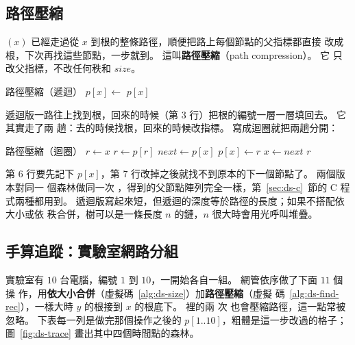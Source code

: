 \subsection{路徑壓縮}
\label{sec:ds-compress}

$(x)$ 已經走過從 $x$ 到根的整條路徑，順便把路上每個節點的父指標都直接
改成根，下次再找這些節點，一步就到。 這叫\textbf{路徑壓縮}（path compression）。 它
只改父指標，不改任何秩和 $\mathit{size}$。

\begin{pseudo}[label=alg:ds-find-rec]{路徑壓縮（遞迴）}
        \State $p[x] \gets$ 
    \EndIf
    \State \Return $p[x]$
\EndFunction
\end{pseudo}

遞迴版一路往上找到根，回來的時候（第 3 行）把根的編號一層一層填回去。 它其實走了兩
趟：去的時候找根，回來的時候改指標。 寫成迴圈就把兩趟分開：

\begin{pseudo}[label=alg:ds-find-iter]{路徑壓縮（迴圈）}
    \State $r \gets x$
     
        \State $r \gets p[r]$
    \EndWhile
     
        \State $\mathit{next} \gets p[x]$
        \State $p[x] \gets r$
        \State $x \gets \mathit{next}$
    \EndWhile
    \State \Return $r$
\EndFunction
\end{pseudo}

第 6 行要先記下 $p[x]$，第 7 行改掉之後就找不到原本的下一個節點了。 兩個版本對同一
個森林做同一次 ，得到的父節點陣列完全一樣，第~\ref{sec:ds-c}~節的 C
程式兩種都用到。 遞迴版寫起來短，但遞迴的深度等於路徑的長度；如果不搭配依大小或依
秩合併，樹可以是一條長度 $n$ 的鏈，$n$ 很大時會用光呼叫堆疊。

\subsection{手算追蹤：實驗室網路分組}
\label{sec:ds-trace}

實驗室有 $10$ 台電腦，編號 $1$ 到 $10$，一開始各自一組。 網管依序做了下面 $11$ 個操
作，用\textbf{依大小合併}（虛擬碼~\ref{alg:ds-size}）加\textbf{路徑壓縮}（虛擬
碼~\ref{alg:ds-find-rec}），一樣大時 $y$ 的根接到 $x$ 的根底下。  裡的兩
次  也會壓縮路徑，這一點常被忽略。 下表每一列是做完那個操作之後的
$p[1..10]$，粗體是這一步改過的格子；圖~\ref{fig:ds-trace} 畫出其中四個時間點的森林。

